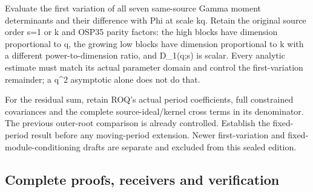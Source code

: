 \documentclass[
]{article}
\begin{document}
Evaluate the first variation of all seven same-source Gamma moment
determinants and their difference with Phi at scale kq. Retain the
original source order s=1 or k and OSP35 parity factors: the high blocks
have dimension proportional to q, the growing low blocks have dimension
proportional to k with a different power-to-dimension ratio, and
D\_1(q;s) is scalar. Every analytic estimate must match its actual
parameter domain and control the first-variation remainder; a q\^{}2
asymptotic alone does not do that.

For the residual sum, retain ROQ's actual period coefficients, full
constrained covariances and the complete source-ideal/kernel cross terms
in its denominator. The previous outer-root comparison is already
controlled. Establish the fixed-period result before any moving-period
extension. Newer first-variation and fixed-module-conditioning drafts
are separate and excluded from this sealed edition.

\subsection{Complete proofs, receivers and
verification}\label{complete-proofs-receivers-and-verification}
\end{document}
